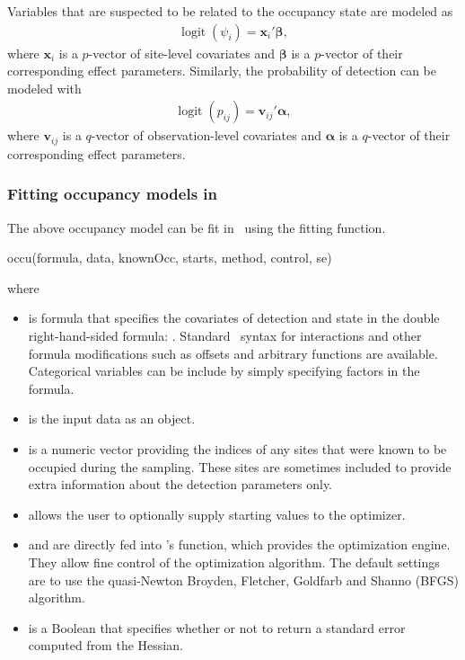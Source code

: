 \documentclass[article,shortnames]{jss}
\DeclareMathOperator{\logit}{logit}
\newcommand{\um}{\pkg{unmarked}}
\newcommand{\rlang}{\proglang{R}}
\begin{document}
Variables that are suspected to be related to the occupancy state are
modeled as
\begin{gather}
  \logit(\psi_i) = \mathbf x_i' \mathbf \beta,
\end{gather}
where $\mathbf x_i$ is a $p$-vector of site-level covariates and $\mathbf \beta$
is a $p$-vector of their corresponding effect parameters.  Similarly, the
probability of detection can be modeled with
\begin{gather}
  \logit(p_{ij}) = \mathbf v_{ij}' \mathbf \alpha,
\end{gather}
where $\mathbf v_{ij}$ is a $q$-vector of observation-level covariates and
$\mathbf \alpha$ is a $q$-vector of their corresponding effect parameters.

\subsubsection[Fitting occupancy models in unmarked]{Fitting occupancy models in \um}

The above occupancy model can be fit in \um\ using the 
fitting function.
\begin{Code}
  occu(formula, data, knownOcc, starts, method, control, se)
\end{Code}
where 
\begin{itemize}
\item {} is formula that specifies the covariates of
  detection and state in the double right-hand-sided formula: .  Standard \rlang\ syntax for
  interactions and other formula modifications such as offsets and
  arbitrary functions are available.  Categorical variables can be
  include by simply specifying factors in the formula.
\item {} is the input data as an
   object.
\item {} is a numeric vector providing the indices of
  any sites that were known to be occupied during the sampling.
  These sites are sometimes included to provide extra information
  about the detection parameters only.
\item {} allows the user to optionally supply starting
  values to the optimizer.
\item {} and  are directly fed into
  \rlang's  function, which provides the optimization
  engine.  They allow fine control of the optimization algorithm.
  The default settings are to use the quasi-Newton Broyden,
  Fletcher, Goldfarb and Shanno (BFGS) algorithm.
\item {} is a Boolean that specifies whether or not to
  return a standard error computed from the Hessian.
\end{itemize}
\end{document}

